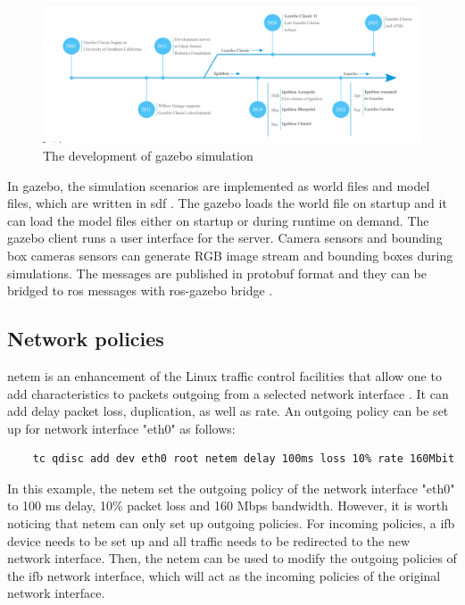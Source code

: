 \begin{figure}
    \centering
    \includegraphics[width=\linewidth]{figures/background/gazebo_development.png}
    \caption{The development of \gls{gazebo} simulation \cite{GazeboSim}} 
    \label{fig:gazebo_development}
\end{figure}

In \gls{gazebo}, the simulation scenarios are implemented as world files and model files, which are written in \gls{sdf} \cite{SDFormat}. The \gls{gazebo} loads the world file on startup and it can load the model files either on startup or during runtime on demand. The \gls{gazebo} client runs a user interface for the server. Camera sensors and bounding box cameras sensors can generate RGB image stream and bounding boxes during simulations. The messages are published in protobuf format and they can be bridged to \gls{ros} messages with \gls{ros}-\gls{gazebo} bridge \cite{GazeboSim}. 



\subsection{Network policies}

\gls{netem} is an enhancement of the Linux traffic control facilities that allow one to add characteristics to packets outgoing from a selected network interface \cite{tc-netem}. It can add delay packet loss, duplication, as well as rate. An outgoing policy can be set up for network interface "eth0" as follows: 

\begin{verbatim}
    tc qdisc add dev eth0 root netem delay 100ms loss 10% rate 160Mbit
\end{verbatim}

In this example, the \gls{netem} set the outgoing policy of the network interface "eth0" to 100 ms delay, 10\% packet loss and 160 Mbps bandwidth. However, it is worth noticing that \gls{netem} can only set up outgoing policies. For incoming policies, a \gls{ifb} device needs to be set up and all traffic needs to be redirected to the new network interface. Then, the \gls{netem} can be used to modify the outgoing policies of the \gls{ifb} network interface, which will act as the incoming policies of the original network interface.
